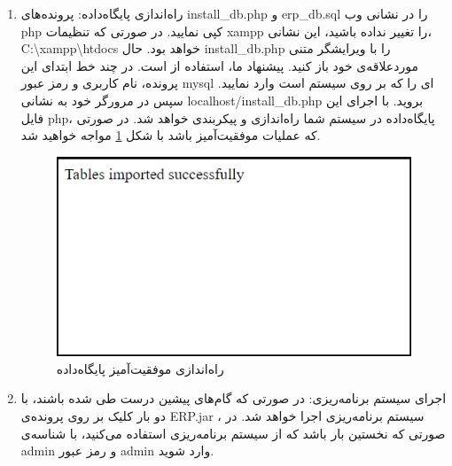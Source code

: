 \begin{enumerate}
		
	\item راه‌اندازی پایگاه‌داده:
	پرونده‌های install\_db.php و erp\_db.sql را در نشانی وب php کپی نمایید. در صورتی که تنظیمات xampp را تغییر نداده باشید، این نشانی، 
	  C:\textbackslash{}xampp\textbackslash{}htdocs خواهد بود. حال install\_db.php را با ویرایشگر متنی موردعلاقه‌ی خود باز کنید. پیشنهاد ما، استفاده از
	است. در چند خط ابتدای این پرونده، نام کاربری و رمز عبور mysql ای را که بر روی سیستم است وارد نمایید.
	 سپس در مرورگر خود به نشانی
	localhost/install\_db.php
	بروید. با اجرای این فایل php، پایگاه‌داده در سیستم شما راه‌اندازی و پیکربندی خواهد شد. در صورتی که عملیات موفقیت‌آمیز باشد با شکل 
	\ref{f15}
	مواجه خواهید شد.
			\begin{figure}[H]
				\centering
				\includegraphics[scale=0.7]{img/install/db}
				\caption{راه‌اندازی موفقیت‌آمیز پایگاه‌داده}
				\label{f15}
			\end{figure}
	
	\item اجرای سیستم برنامه‌ریزی: 
در صورتی که گام‌های پیشین درست طی شده باشند، با دو بار کلیک بر روی پرونده‌ی ERP.jar ، سیستم برنامه‌ریزی اجرا خواهد شد. در صورتی که نخستین بار باشد که از سیستم برنامه‌ریزی استفاده می‌کنید، با شناسه‌ی admin و رمز عبور admin وارد شوید. 
	
\end{enumerate}